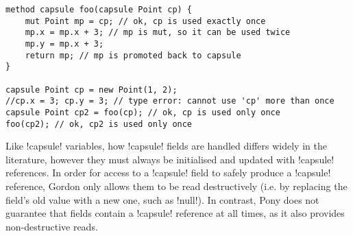 \begin{lstlisting}
method capsule foo(capsule Point cp) {
	mut Point mp = cp; // ok, cp is used exactly once
	mp.x = mp.x + 3; // mp is mut, so it can be used twice
	mp.y = mp.x + 3;
	return mp; // mp is promoted back to capsule
}

capsule Point cp = new Point(1, 2);
//cp.x = 3; cp.y = 3; // type error: cannot use 'cp' more than once
capsule Point cp2 = foo(cp); // ok, cp is used only once
foo(cp2); // ok, cp2 is used only once
\end{lstlisting}

Like \Q!capsule! variables, how \Q!capsule! fields are handled differs widely in the literature, however they must always be initialised and updated with \Q!capsule! references. In order for access to a \Q!capsule! field to safely produce a \Q!capsule! reference, Gordon \etal only allows them to be read destructively (i.e. by replacing the field's old value with a new one, such as \Q!null!). 
In contrast, 
Pony does not guarantee that \Q@capsule@ fields contain a \Q!capsule! reference at all times, as it also provides non-destructive reads.


